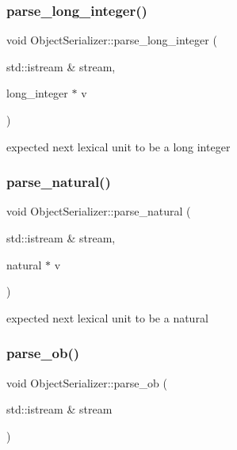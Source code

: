 \subsubsection{\texorpdfstring{parse\+\_\+long\+\_\+integer()}{parse\_long\_integer()}}
{\footnotesize\ttfamily void Object\+Serializer\+::parse\+\_\+long\+\_\+integer (\begin{DoxyParamCaption}\item[{std\+::istream \&}]{stream,  }\item[{long\+\_\+integer $\ast$}]{v }\end{DoxyParamCaption})\hspace{0.3cm}{\ttfamily [static]}}

expected next lexical unit to be a long integer \mbox{\label{classez_1_1objects_1_1ObjectSerializer_a9019cc0ebd7ea59945af0f77fe819e5b}} 
\subsubsection{\texorpdfstring{parse\+\_\+natural()}{parse\_natural()}}
{\footnotesize\ttfamily void Object\+Serializer\+::parse\+\_\+natural (\begin{DoxyParamCaption}\item[{std\+::istream \&}]{stream,  }\item[{natural $\ast$}]{v }\end{DoxyParamCaption})\hspace{0.3cm}{\ttfamily [static]}}

expected next lexical unit to be a natural \mbox{\label{classez_1_1objects_1_1ObjectSerializer_ae0095f6fcfbeb5b0aaf98d3f1b355f45}} 
\subsubsection{\texorpdfstring{parse\+\_\+ob()}{parse\_ob()}}
{\footnotesize\ttfamily void Object\+Serializer\+::parse\+\_\+ob (\begin{DoxyParamCaption}\item[{std\+::istream \&}]{stream }\end{DoxyParamCaption})\hspace{0.3cm}{\ttfamily [static]}}

